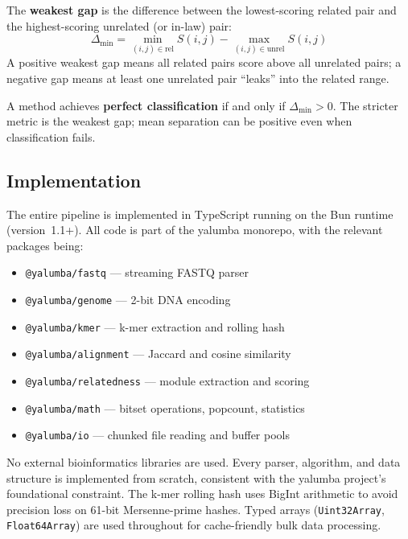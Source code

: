 \documentclass{../yalumba}
\begin{document}
\begin{definition}
The \textbf{weakest gap} is the difference between the lowest-scoring related
pair and the highest-scoring unrelated (or in-law) pair:
\begin{equation}
  \Delta_{\min} = \min_{(i,j) \in \text{rel}} S(i,j)
                  - \max_{(i,j) \in \text{unrel}} S(i,j)
  \label{eq:weakest-gap}
\end{equation}
A positive weakest gap means all related pairs score above all unrelated pairs;
a negative gap means at least one unrelated pair ``leaks'' into the related
range.
\end{definition}

A method achieves \textbf{perfect classification} if and only if
$\Delta_{\min} > 0$.  The stricter metric is the weakest gap; mean separation
can be positive even when classification fails.

\subsection{Implementation}

The entire pipeline is implemented in TypeScript running on the Bun runtime
(version~1.1+).  All code is part of the yalumba monorepo, with the relevant
packages being:

\begin{itemize}
  \item \texttt{@yalumba/fastq} --- streaming FASTQ parser
  \item \texttt{@yalumba/genome} --- 2-bit DNA encoding
  \item \texttt{@yalumba/kmer} --- k-mer extraction and rolling hash
  \item \texttt{@yalumba/alignment} --- Jaccard and cosine similarity
  \item \texttt{@yalumba/relatedness} --- module extraction and scoring
  \item \texttt{@yalumba/math} --- bitset operations, popcount, statistics
  \item \texttt{@yalumba/io} --- chunked file reading and buffer pools
\end{itemize}


No external bioinformatics libraries are used.  Every parser, algorithm, and
data structure is implemented from scratch, consistent with the yalumba
project's foundational constraint.  The k-mer rolling hash uses BigInt
arithmetic to avoid precision loss on 61-bit Mersenne-prime hashes.  Typed
arrays (\texttt{Uint32Array}, \texttt{Float64Array}) are used throughout for
cache-friendly bulk data processing.
\end{document}
